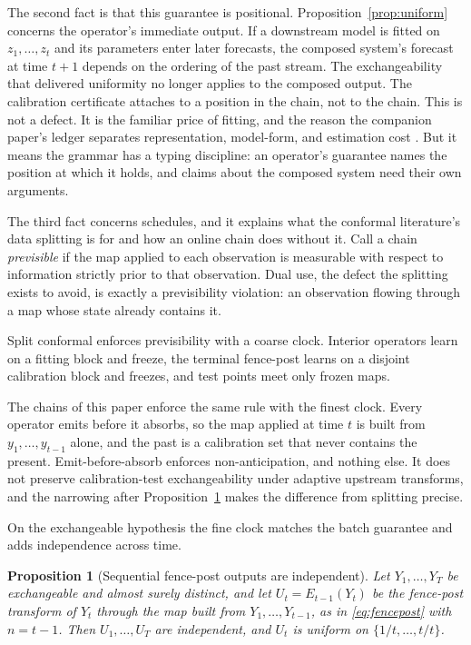 \documentclass[11pt]{article}
\newtheorem{proposition}{Proposition}
\theoremstyle{remark}
\begin{document}
The second fact is that this guarantee is positional. Proposition~\ref{prop:uniform}
concerns the operator's immediate output. If a downstream model is fitted on
$z_1, \dots, z_t$ and its parameters enter later forecasts, the composed system's
forecast at time $t+1$ depends on the ordering of the past stream. The exchangeability
that delivered uniformity no longer applies to the composed output. The calibration certificate
attaches to a position in the chain, not to the chain. This is not a defect. It is the
familiar price of fitting, and the reason the companion paper's ledger separates
representation, model-form, and estimation cost \citep{cotton2026gap}. But it means the
grammar has a typing discipline: an operator's guarantee names the position at which it
holds, and claims about the composed system need their own arguments.

The third fact concerns schedules, and it explains what the conformal literature's data
splitting is for and how an online chain does without it. Call a chain \emph{previsible}
if the map applied to each observation is measurable with respect to information strictly
prior to that observation. Dual use, the defect the splitting exists to avoid, is exactly
a previsibility violation: an observation flowing through a map whose state already
contains it.

Split conformal enforces previsibility with a coarse clock. Interior
operators learn on a fitting block and freeze, the terminal fence-post learns on a
disjoint calibration block and freezes, and test points meet only frozen maps.

The chains
of this paper enforce the same rule with the finest clock. Every operator emits before it
absorbs, so the map applied at time $t$ is built from $y_1, \dots, y_{t-1}$ alone, and
the past is a calibration set that never contains the present. Emit-before-absorb
enforces non-anticipation, and nothing else. It does not preserve calibration-test
exchangeability under adaptive upstream transforms, and the narrowing after
Proposition~\ref{prop:sequential} makes the difference from splitting precise.

On the exchangeable hypothesis the fine clock matches the batch guarantee and adds
independence across time.

\begin{proposition}[Sequential fence-post outputs are independent]\label{prop:sequential}
Let $Y_1, \dots, Y_T$ be exchangeable and almost surely distinct, and let
$U_t = E_{t-1}(Y_t)$ be the fence-post transform of $Y_t$ through the map built from
$Y_1, \dots, Y_{t-1}$, as in \eqref{eq:fencepost} with $n = t - 1$. Then
$U_1, \dots, U_T$ are independent, and $U_t$ is uniform on $\{1/t, \dots, t/t\}$.
\end{proposition}
\end{document}
